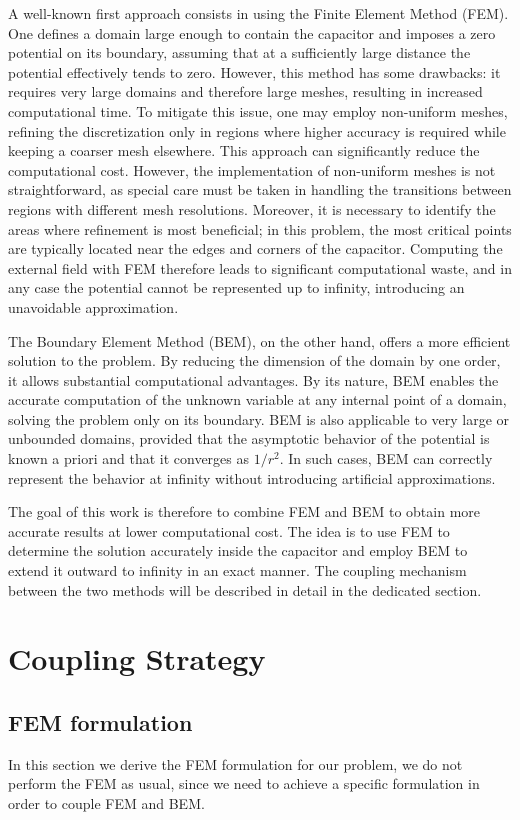 \documentclass[11pt,onecolumn]{article}
\begin{document}
A well-known first approach consists in using the Finite Element Method (FEM). One defines a domain large enough to contain the capacitor and imposes a zero potential on its boundary, assuming that at a sufficiently large distance the potential effectively tends to zero. However, this method has some drawbacks: it requires very large domains and therefore large meshes, resulting in increased computational time. To mitigate this issue, one may employ non-uniform meshes, refining the discretization only in regions where higher accuracy is required while keeping a coarser mesh elsewhere. This approach can significantly reduce the computational cost. However, the implementation of non-uniform meshes is not straightforward, as special care must be taken in handling the transitions between regions with different mesh resolutions. Moreover, it is necessary to identify the areas where refinement is most beneficial; in this problem, the most critical points are typically located near the edges and corners of the capacitor. Computing the external field with FEM therefore leads to significant computational waste, and in any case the potential cannot be represented up to infinity, introducing an unavoidable approximation.

The Boundary Element Method (BEM), on the other hand, offers a more efficient solution to the problem. By reducing the dimension of the domain by one order, it allows substantial computational advantages. By its nature, BEM enables the accurate computation of the unknown variable at any internal point of a domain, solving the problem only on its boundary. BEM is also applicable to very large or unbounded domains, provided that the asymptotic behavior of the potential is known a priori and that it converges as $1/r^2$. In such cases, BEM can correctly represent the behavior at infinity without introducing artificial approximations.

The goal of this work is therefore to combine FEM and BEM to obtain more accurate results at lower computational cost. The idea is to use FEM to determine the solution accurately inside the capacitor and employ BEM to extend it outward to infinity in an exact manner. The coupling mechanism between the two methods will be described in detail in the dedicated section. ~\cite{fem_bem_text}

\section{Coupling Strategy}
\subsection{FEM formulation}
In this section we derive the FEM formulation for our problem, we do not perform the FEM as usual, since we need to achieve a specific formulation in order to couple FEM and BEM.
\end{document}
